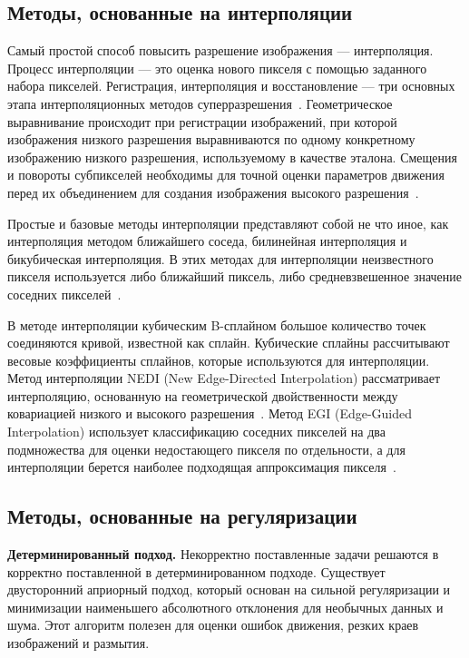 \documentclass{bmstu}
\begin{document}
\subsection{Методы, основанные на интерполяции}

Самый простой способ повысить разрешение изображения --- интерполяция. 
Процесс интерполяции --- это оценка нового пикселя с помощью заданного набора пикселей. 
Регистрация, интерполяция и восстановление --- три основных этапа интерполяционных методов суперразрешения~\cite{Thapa2016}. 
Геометрическое выравнивание происходит при регистрации изображений, при которой изображения низкого разрешения выравниваются по одному конкретному изображению низкого разрешения, используемому в качестве эталона. 
Смещения и повороты субпикселей необходимы для точной оценки параметров движения перед их объединением для создания изображения высокого разрешения~\cite{Daithankar2021}.

Простые и базовые методы интерполяции представляют собой не что иное, как интерполяция методом ближайшего соседа, билинейная интерполяция и бикубическая интерполяция. 
В этих методах для интерполяции неизвестного пикселя используется либо ближайший пиксель, либо средневзвешенное значение соседних пикселей~\cite{Daithankar2021}.

В методе интерполяции кубическим B-сплайном большое количество точек соединяются кривой, известной как сплайн. 
Кубические сплайны рассчитывают весовые коэффициенты сплайнов, которые используются для интерполяции. 
Метод интерполяции NEDI (New Edge-Directed Interpolation) рассматривает интерполяцию, основанную на геометрической двойственности между ковариацией низкого и высокого разрешения~\cite{Daithankar2021}. 
Метод EGI (Edge-Guided Interpolation) использует классификацию соседних пикселей на два подмножества для оценки недостающего пикселя по отдельности, а для интерполяции берется наиболее подходящая аппроксимация пикселя~\cite{Zhang2006}.

\subsection{Методы, основанные на регуляризации}

\textbf{Детерминированный подход.} 
Некорректно поставленные задачи решаются в корректно поставленной в детерминированном подходе. 
Существует двусторонний априорный подход, который основан на сильной регуляризации и минимизации наименьшего абсолютного отклонения для необычных данных и шума. 
Этот алгоритм полезен для оценки ошибок движения, резких краев изображений и размытия. 
\end{document}
